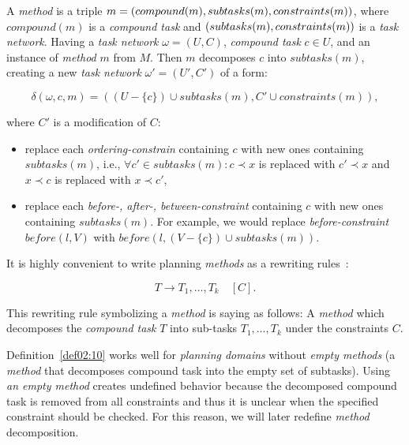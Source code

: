 \begin{defn}\label{def02:10}
    A \emph{method} is a triple $m = (compound(m),subtasks(m), \\ constraints(m))$, where $compound(m)$ is a \emph{compound  task} and $(subtasks(m), \\ constraints(m))$ is a \emph{task network}. Having a \emph{task network} $\omega=(U,C)$, \emph{compound task} $c \in U$, and an instance of \emph{method} $m$ from $M$. Then $m$ decomposes $c$ into $subtasks(m)$, creating a new \emph{task network} $\omega'=(U',C')$ of a form:

    \[
    \delta(\omega,c,m) = ((U-\{c\}) \cup subtasks(m), C' \cup constraints(m)),
    \]

    \noindent
    where $C'$ is a modification of $C$:

    \begin{itemize}
        \item replace each \emph{ordering-constrain} containing $c$ with new ones containing $subtasks(m)$, i.e., $\forall c' \in subtasks(m): c \prec x$ is replaced with $c' \prec x$ and $x \prec c$ is replaced with $x \prec c'$,
        
        \item replace each \emph{before-, after-, between-constraint} containing $c$ with new ones containing $subtasks(m)$. For example, we would replace \emph{before-constraint} $before(l,V)$ with $before(l,(V - \{c\}) \cup subtasks(m))$.
    \end{itemize}
\end{defn}

\medbreak\noindent
It is highly convenient to write planning \emph{methods} as a rewriting rules~\cite{ondrckova2023semantics}:

\[
T \rightarrow T_1,\dots,T_k \quad [C].
\]

\noindent
This rewriting rule symbolizing a \emph{method} is saying as follows: A \emph{method} which decomposes the \emph{compound task} $T$ into sub-tasks $T_1,\dots,T_k$ under the constraints $C$.

\medbreak\noindent
Definition~\ref{def02:10} works well for \emph{planning domains} without \emph{empty methods} (a \emph{method} that decomposes compound task into the empty set of subtasks). Using \emph{an empty method} creates undefined behavior because the decomposed compound task is removed from all constraints and thus it is unclear when the specified constraint should be checked. For this reason, we will later redefine \emph{method} decomposition. 

